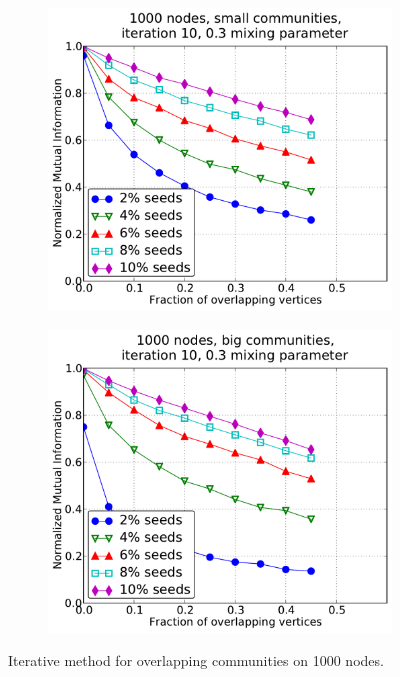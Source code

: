 \begin{figure}[h!]
\begin{subfigure}{0.5\textwidth}
    \end{subfigure}
    \begin{subfigure}{0.5\textwidth}
    \centering
    \includegraphics[width=\appplotwidth]{plots/overlap_iter_3mu_a.pdf}
    \end{subfigure}%
    \begin{subfigure}{0.5\textwidth}
    \centering
    \includegraphics[width=\appplotwidth]{plots/overlap_iter_3mu_b.pdf}
    \end{subfigure}
    \caption{Iterative method for overlapping communities on 1000 nodes.}\label{fig:iter_overlap_1000N}
\end{figure}
